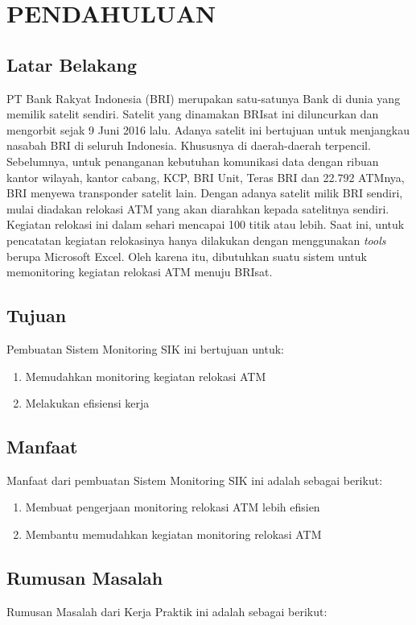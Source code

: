 \chapter{PENDAHULUAN}

\section{Latar Belakang}
\tab PT Bank Rakyat Indonesia (BRI) merupakan satu-satunya Bank di dunia yang memilik satelit sendiri. Satelit yang dinamakan BRIsat ini diluncurkan dan mengorbit sejak 9 Juni 2016 lalu. Adanya satelit ini bertujuan untuk menjangkau nasabah BRI di seluruh Indonesia. Khususnya di daerah-daerah terpencil.
\tab Sebelumnya, untuk penanganan kebutuhan komunikasi data dengan ribuan kantor wilayah, kantor cabang, KCP, BRI Unit, Teras BRI dan 22.792 ATMnya, BRI menyewa transponder satelit lain. Dengan adanya satelit milik BRI sendiri, mulai diadakan relokasi ATM yang akan diarahkan kepada satelitnya sendiri.\\
\tab Kegiatan relokasi ini dalam sehari mencapai 100 titik atau lebih. Saat ini, untuk pencatatan kegiatan relokasinya hanya dilakukan dengan menggunakan \textit{tools} berupa Microsoft Excel. Oleh karena itu, dibutuhkan suatu sistem untuk memonitoring kegiatan relokasi ATM menuju BRIsat\cite{bri}.

\section{Tujuan}
Pembuatan Sistem Monitoring SIK ini bertujuan untuk:
\begin{enumerate}
\item Memudahkan monitoring kegiatan relokasi ATM
\item Melakukan efisiensi kerja 
\end{enumerate}

\section{Manfaat}
Manfaat dari pembuatan Sistem Monitoring SIK ini adalah sebagai berikut:

\begin{enumerate}
	\item Membuat pengerjaan monitoring relokasi ATM lebih efisien
	\item Membantu memudahkan kegiatan monitoring relokasi ATM
\end{enumerate}

\section{Rumusan Masalah}
Rumusan Masalah dari Kerja Praktik ini adalah sebagai berikut:

